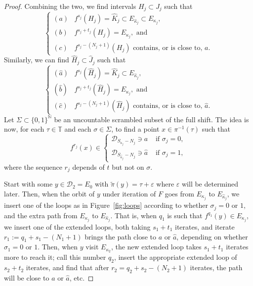 \documentclass[12pt, psamsfonts, reqno]{amsart}
\begin{document}
\begin{proof}
Combining the two, we find intervals $H_j \subset J_j$
such that
$$
\left\{ \begin{array}{ll}
(a) & f^{s_j}(H_j) = \hat K_j \subset E_{\hat \kappa_j} \subset  E_{\kappa_j}, \\[1mm]
(b) & f^{s_j+t_j}(H_j) =  E_{\kappa_j}, \text{ and } \\[1mm]
(c) & f^{s_j-(N_j+1)}(H_j) \text{ contains, or is close to, } a. \end{array} \right.
$$
Similarly, we can find $\hat H_j \subset \hat J_j$ such that
$$
\left\{ \begin{array}{ll}
(\hat a) & f^{s_j}(\hat H_j) = \hat K_j \subset E_{\hat \kappa_j},\\[1mm]
(\hat b) & f^{s_j+t_j}(\hat H_j) =  E_{\kappa_j}, \text{ and } \\[1mm]
(\hat c) & f^{s_j-(N_j+1)}(\hat H_j) \text{ contains, or is close to, } \hat a.
\end{array} \right.
$$
Let $\Sigma \subset \{ 0, 1\}^{{\mathbb N}}$ be an uncountable
scrambled subset of the full shift.
The idea is now, for each $\tau \in {{\mathbb T}}$ and each $\sigma \in \Sigma$,
to find a point $x \in \pi^{-1}(\tau)$ such that
\begin{equation}\label{eq:x}
f^{r_j}(x) \in \left\{  \begin{array}{ll}
{{\mathcal D}}_{S_{\kappa_j} - N_j} \owns a  & \text{ if } \sigma_j = 0, \\
{{\mathcal D}}_{S_{\hat \kappa_j}-N_j}\owns \hat a & \text{ if } \sigma_j = 1,
\end{array}\right.
\end{equation}
where the sequence $r_j$ depends of $t$ but not on $\sigma$.

Start with some $y \in {{\mathcal D}}_2 = E_0$ with $\tilde \pi(y) = \tau+{\varepsilon}$ where
${\varepsilon}$ will be determined later.
Then, when the orbit of $y$ under iteration of $F$ goes from $E_{\kappa_j}$ to
$E_{\hat \kappa_j}$, we insert one of the loops as in Figure~\ref{fig:loops}
according to whether $\sigma_j = 0$ or $1$, and the extra path from $E_{\kappa_j}$ to $E_{\hat \kappa_j}$.
That is, when $q_1$ is such that $f^{q_1}(y) \in E_{\kappa_j}$,
we insert one of the extended loops, both taking $s_1 + t_1$ iterates,
and iterate $r_1 := q_1+s_1-(N_1+1)$ brings the path close to $a$ or $\hat a$,
depending on whether $\sigma_1 = 0$ or $1$.
Then, when $y$ visit $E_{\kappa_2}$, the new extended loop takes $s_1 + t_1$ iterates more to reach it; call this number $q_2$, insert the
appropriate extended loop of $s_2+t_2$ iterates, and find that after
$r_2 = q_2+s_2-(N_2+1)$ iterates,
the path will be close to $a$ or $\hat a$, etc.


\end{proof}
\end{document}
